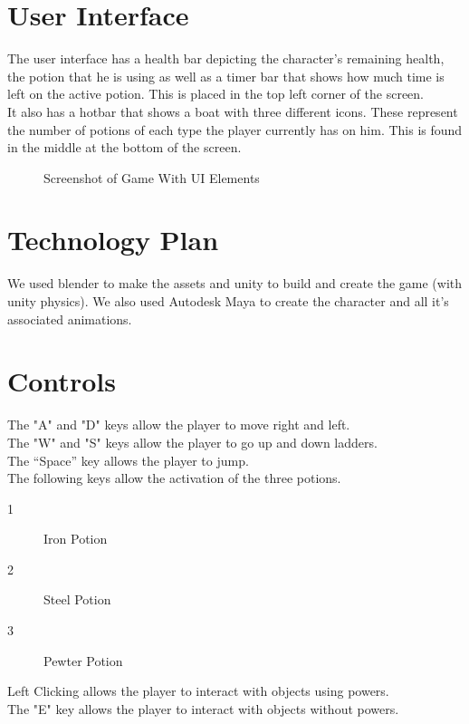 \documentclass{article}
\begin{document}
\section{User Interface}

The user interface has a health bar depicting the character's remaining health, the potion that he is using as well as a timer bar that shows how much time is left on the active potion. This is placed in the top left corner of the screen.\\

It also has a hotbar that shows a boat with three different icons. These represent the number of potions of each type the player currently has on him. This is found in the middle at the bottom of the screen.

 \begin{figure}[!htb]
  \caption {Screenshot of Game With UI Elements}
  \end{figure}

\section{Technology Plan}
We used blender to make the assets and unity to build and create the game (with unity physics). We also used Autodesk Maya to create the character and all it's associated animations.

\section{Controls}
The "A" and "D" keys allow the player to move right and left.\\
The "W" and "S" keys allow the player to go up and down ladders.\\
The “Space” key allows the player to jump.\\
The following keys allow the activation of the three potions.
\begin{description}
	\item[1] Iron Potion
	\item[2] Steel Potion
	\item[3] Pewter Potion
\end{description}
Left Clicking allows the player to interact with objects using powers.\\
The "E" key allows the player to interact with objects without powers.
\end{document}
